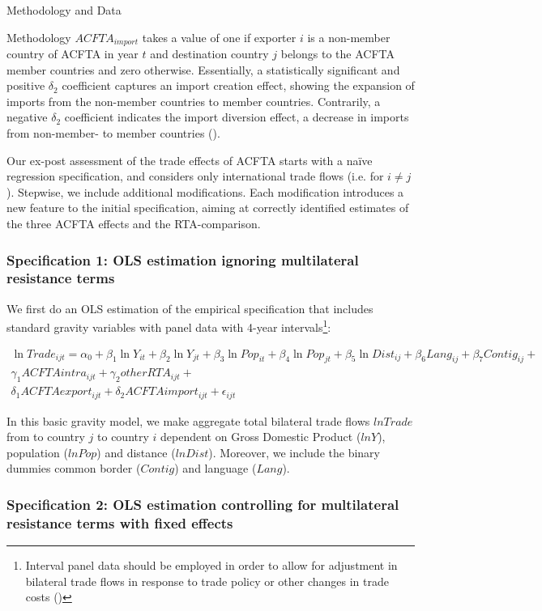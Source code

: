 \begin{section}{Methodology and Data }
\begin{subsection}{Methodology }
\textbf{\textbf{$ACFTA_{import}$}} takes a value of one if exporter $i$ is a non-member country of ACFTA in year $t$ and destination country $j$ belongs to the ACFTA member countries and zero otherwise. Essentially, a statistically significant and positive $\delta_2$ coefficient captures an import creation effect, showing the expansion of imports from the non-member countries to member countries. Contrarily, a negative $\delta_2$ coefficient indicates the import diversion effect, a decrease in imports from non-member- to member countries (\cite{carrere_2006}).

Our ex-post assessment of the trade effects of ACFTA starts with a naïve regression specification, and considers only international trade flows (i.e. for $i \neq j$). Stepwise, we include additional modifications. Each modification introduces a new feature to the initial specification, aiming at correctly identified estimates of the three ACFTA effects and the RTA-comparison.

\subsubsection*{Specification 1: OLS estimation ignoring multilateral resistance terms}

We first do an OLS estimation of the empirical specification that includes standard gravity variables with panel data with 4-year intervals\footnote{Interval panel data should be employed in order to allow for adjustment in bilateral trade flows in response to trade policy or other changes in trade costs (\cite{ypl_2016})}:

\begin{multline}\label{eq_5}
\ln{Trade_{ijt}} = \alpha_0 + \beta_1 \ln{Y_{it}} + \beta_2 \ln{Y_{jt}} + \beta_3 \ln{Pop_{it}} + \beta_4 \ln{Pop_{jt}}  + \beta_5 \ln{Dist_{ij}} + \beta_6 Lang_{ij} + \beta_7 Contig_{ij} + \\
\gamma_1 ACFTAintra_{ijt} + \gamma_2 otherRTA_{ijt} + \\ 
\delta_1 ACFTAexport_{ijt} + \delta_2 ACFTAimport_{ijt} + \epsilon_{ijt}
\end{multline}

In this basic gravity model, we make aggregate total bilateral trade flows $lnTrade$ from to country $j$ to country $i$ dependent on Gross Domestic Product ($lnY$), population ($lnPop$) and distance ($lnDist$). Moreover, we include the binary dummies common border ($Contig$) and language ($Lang$). 


\subsubsection*{Specification 2: OLS estimation controlling for multilateral resistance terms with fixed effects}


\end{subsection}
\end{section}
